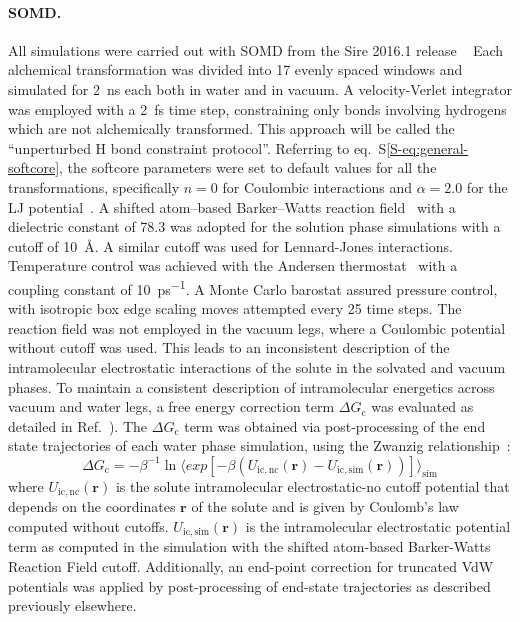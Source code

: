 \documentclass[journal=jctcce,manuscript=article]{achemso}
\begin{document}
\paragraph{SOMD.} All simulations were carried out with
SOMD from the Sire 2016.1 release ~\cite{Sire-2016, doi:10.1021/ct300857j}
Each alchemical transformation was
divided into 17 evenly spaced windows and simulated for \SI{2}{ns}
each both in water and in vacuum. A velocity-Verlet integrator was
employed with a \SI{2}{fs} time step, constraining only bonds involving hydrogens which are not alchemically transformed.  This approach will be called the ``unperturbed H bond constraint protocol''. Referring to eq.~S\ref{S-eq:general-softcore}, the softcore parameters were set to default values for all the transformations, specifically $n = 0$ for Coulombic interactions and $\alpha = 2.0$ for the LJ potential~\cite{doi:10.1021/ct700081t}.  A shifted atom--based Barker--Watts reaction field~\cite{doi:10.1080/00268977300102101} with
a dielectric constant of \num{78.3} was adopted for the solution phase
simulations with a cutoff of \SI{10}{\angstrom}. A similar cutoff was used for 
Lennard-Jones interactions. Temperature control was achieved with the Andersen
thermostat~\cite{doi:10.1063/1.439486} with a coupling constant of
\SI{10}{ps^{-1}}.  A Monte Carlo barostat assured pressure control,
with isotropic box edge scaling moves attempted every 25 time steps.
The reaction field was not employed in the vacuum legs, where a Coulombic 
potential without cutoff was used.  This leads to an inconsistent description of the intramolecular electrostatic interactions of the solute in the solvated and vacuum phases.   To maintain a consistent description of intramolecular 
energetics across vacuum and water legs, a free energy correction term $\Delta G_{\mathrm{c}}$ was  evaluated as detailed in Ref.~).  The
$\Delta G_{\mathrm{c}}$ term was obtained via post-processing of the end state 
trajectories of each water phase simulation, using the Zwanzig 
relationship~\cite{zwanzig_high-temperature_1954}:
\begin{equation}
 \label{eq:ZwanzigDGfunc}
 \Delta G_{\mathrm{c}} = -\beta^{-1} \ln \langle exp 
 \left[-\beta(U_{\mathrm{ic,nc}}(\mathbf{r}) - 
 U_{\mathrm{ic,sim}}(\mathbf{r}))\right]\rangle_{\mathrm{sim}}
\end{equation}
where $U_{\mathrm{ic,nc}}(\mathbf{r})$ is the solute intramolecular 
electrostatic-no cutoff 
potential that depends on the coordinates $\mathbf{r}$ of the solute and is 
given by Coulomb's law computed without cutoffs. 
$U_{\mathrm{ic,sim}}(\mathbf{r})$ is the intramolecular electrostatic potential 
term as
computed in the simulation with the shifted atom-based Barker-Watts Reaction 
Field cutoff. Additionally, an end-point correction for truncated VdW potentials was applied by post-processing of end-state trajectories as described previously elsewhere.~\cite{shirtsLRC,BosisioHG}
\end{document}
